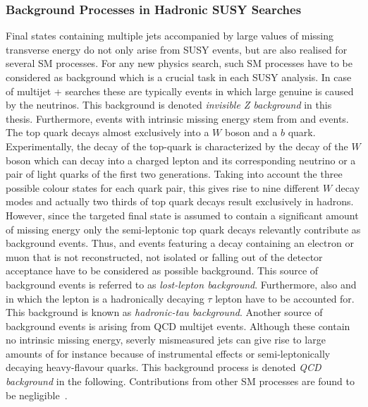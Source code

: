 \subsubsection*{Background Processes in Hadronic SUSY Searches}
\label{subsubsec:susy_backgrounds}
Final states containing multiple jets accompanied by large values of missing transverse energy do not only arise from SUSY events, but are also realised for several SM processes. For any new physics search, such SM processes have to be considered as background which is a crucial task in each SUSY analysis. In case of multijet + \met searches these are typically \ZInvJets events in which large genuine \met is caused by the neutrinos. This background is denoted \textit{invisible Z background} in this thesis. Furthermore, events with intrinsic missing energy stem from \WJets and \ttbar events. 
The top quark decays almost exclusively into a $W$ boson and a $b$ quark. Experimentally, the decay of the top-quark is characterized by the decay of the $W$ boson which can decay into a charged lepton and its corresponding neutrino or a pair of light quarks of the first two generations. Taking into account the three possible colour states for each quark pair, this gives rise to nine different $W$ decay modes and actually two thirds of top quark decays result exclusively in hadrons. However, since the targeted final state is assumed to contain a significant amount of missing energy only the semi-leptonic top quark decays relevantly contribute as background events. Thus, \WJets and \ttbar events featuring a decay containing an electron or muon that is not reconstructed, not isolated or falling out of the detector acceptance have to be considered as possible background. This source of background events is referred to as \textit{lost-lepton background}. Furthermore, also \WJets and \ttbar in which the lepton is a hadronically decaying $\tau$ lepton have to be accounted for. This background is known as \textit{hadronic-tau background}. Another source of background events is arising from QCD multijet events. Although these contain no intrinsic missing energy, severly mismeasured jets can give rise to large amounts of \met for instance because of instrumental effects or semi-leptonically decaying heavy-flavour quarks. This background process is denoted \textit{QCD background} in the following. Contributions from other SM processes are found to be negligible~\cite{springerlink:10.1007/JHEP08(2011)155, Chatrchyan:2012lia}.  


